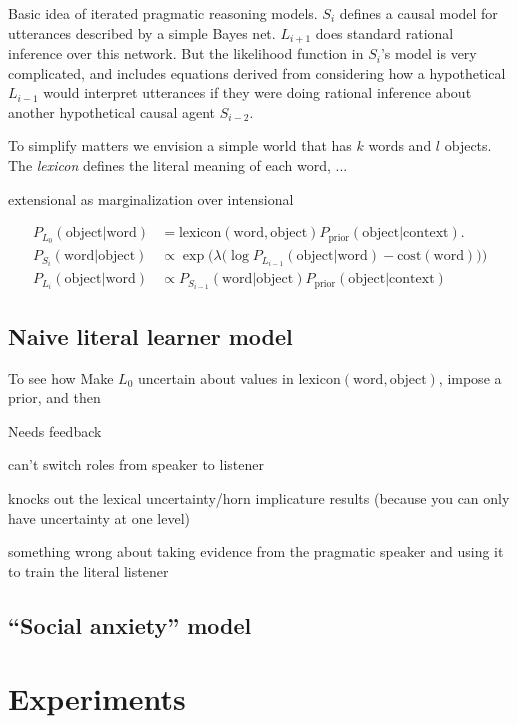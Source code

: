 \documentclass{article} %
\newcommand{\word}{\text{word}}
\newcommand{\obj}{\text{object}}
\begin{document}
Basic idea of iterated pragmatic reasoning models. $S_i$ defines a causal model for utterances described by a simple Bayes net. $L_{i+1}$ does standard rational inference over this network. But the likelihood function in $S_i$'s model is very complicated, and includes equations derived from considering how a hypothetical $L_{i-1}$ would interpret utterances if they were doing rational inference about another hypothetical causal agent $S_{i-2}$.

To simplify matters we envision a simple world that has $k$ words and $l$ objects. The \textit{lexicon} defines the literal meaning of each word, ...

extensional as marginalization over intensional

\begin{align*}
P_{L_0}(\obj | \word) &= \text{lexicon}(\word, \obj) P_{\text{prior}}(\obj | \text{context}). \\
P_{S_i}(\word | \obj) &\propto \exp\Big(\lambda \big(\log P_{L_{i - 1}}(\obj | \word) - \text{cost}(\word)\big)\Big) \\
P_{L_i}(\obj | \word) &\propto P_{S_{i-1}}(\word | \obj) P_{\text{prior}}(\obj | \text{context})
\end{align*}

\subsection{Naive literal learner model}



To see how
Make $L_0$ uncertain about values in $\text{lexicon}(\word, \obj)$, impose a prior, and then

Needs feedback

can't switch roles from speaker to listener

knocks out the lexical uncertainty/horn implicature results (because you can only have uncertainty at one level)

something wrong about taking evidence from the pragmatic speaker and using it to train the literal listener

\subsection{``Social anxiety'' model}

\section{Experiments}
\end{document}
